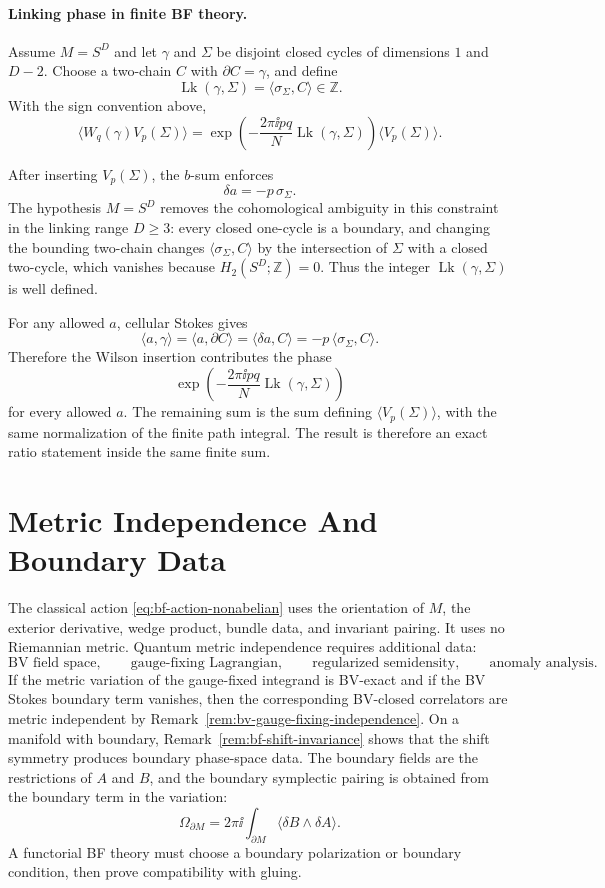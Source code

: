 \paragraph{Linking phase in finite BF theory.}
Assume \(M=S^D\) and let \(\gamma\) and \(\Sigma\) be disjoint closed cycles
of dimensions \(1\) and \(D-2\).  Choose a two-chain \(C\) with
\(\partial C=\gamma\), and define
\[
  \operatorname{Lk}(\gamma,\Sigma)
  =
  \langle\sigma_\Sigma,C\rangle\in\mathbb Z .
\]
With the sign convention above,
\[
  \langle W_q(\gamma)V_p(\Sigma)\rangle
  =
  \exp\!\left(
    -\frac{2\pi\ii pq}{N}\operatorname{Lk}(\gamma,\Sigma)
  \right)
  \langle V_p(\Sigma)\rangle .
\]

After inserting \(V_p(\Sigma)\), the \(b\)-sum enforces
\[
  \delta a=-p\,\sigma_\Sigma .
\]
The hypothesis \(M=S^D\) removes the cohomological ambiguity in this
constraint in the linking range \(D\ge3\): every closed one-cycle is a
boundary, and changing the bounding two-chain changes
\(\langle\sigma_\Sigma,C\rangle\) by the intersection of \(\Sigma\) with a
closed two-cycle, which vanishes because \(H_2(S^D;\mathbb Z)=0\).  Thus the
integer \(\operatorname{Lk}(\gamma,\Sigma)\) is well defined.

For any allowed \(a\), cellular Stokes gives
\[
  \langle a,\gamma\rangle
  =
  \langle a,\partial C\rangle
  =
  \langle\delta a,C\rangle
  =
  -p\,\langle\sigma_\Sigma,C\rangle .
\]
Therefore the Wilson insertion contributes the phase
\[
  \exp\!\left(
    -\frac{2\pi\ii pq}{N}\operatorname{Lk}(\gamma,\Sigma)
  \right)
\]
for every allowed \(a\).  The remaining sum is the sum defining
\(\langle V_p(\Sigma)\rangle\), with the same normalization of the finite
path integral.  The result is therefore an exact ratio statement inside the
same finite sum.

\section{Metric Independence And Boundary Data}

The classical action \eqref{eq:bf-action-nonabelian} uses the orientation of
\(M\), the exterior derivative, wedge product, bundle data, and invariant
pairing.  It uses no Riemannian metric.  Quantum metric independence requires
additional data:
\[
  \text{BV field space},\qquad
  \text{gauge-fixing Lagrangian},\qquad
  \text{regularized semidensity},\qquad
  \text{anomaly analysis}.
\]
If the metric variation of the gauge-fixed integrand is BV-exact and if the
BV Stokes boundary term vanishes, then the corresponding BV-closed
correlators are metric independent by
Remark~\ref{rem:bv-gauge-fixing-independence}.  On a manifold with
boundary, Remark~\ref{rem:bf-shift-invariance} shows that the shift
symmetry produces boundary phase-space data.  The boundary fields are the
restrictions of \(A\) and \(B\), and the boundary symplectic pairing is
obtained from the boundary term in the variation:
\[
  \Omega_{\partial M}
  =
  2\pi\ii\int_{\partial M}\langle\delta B\wedge\delta A\rangle .
\]
A functorial BF theory must choose a boundary polarization or boundary
condition, then prove compatibility with gluing.

